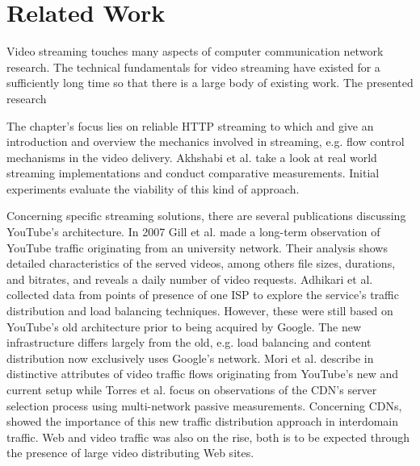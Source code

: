 \section{Related Work}


Video streaming touches many aspects of computer communication network research. The technical fundamentals for video streaming have existed for a sufficiently long time so that there is a large body of existing work. The presented research 

The chapter's focus lies on reliable \gls{HTTP} streaming to which \cite{watching-video1,watching-video2} and \cite{ma2011mobile} give an introduction and overview the mechanics involved in streaming, e.g. flow control mechanisms in the video delivery. Akhshabi et al. \cite{akhshabi2011experimental} take a look at real world streaming implementations and conduct comparative measurements. Initial experiments evaluate the viability of this kind of approach. 

Concerning specific streaming solutions, there are several publications discussing YouTube's architecture. In 2007 Gill et al. \cite{gill2007youtube} made a long-term observation of YouTube traffic originating from an university network. Their analysis shows detailed characteristics of the served videos, among others file sizes, durations, and bitrates, and reveals a daily number of video requests. Adhikari et al. \cite{adhikari2010youtube} collected data from points of presence of one ISP to explore the service's traffic distribution and load balancing techniques. However, these were still based on YouTube's old architecture prior to being acquired by Google. The new infrastructure differs largely from the old, e.g. load balancing and content distribution now exclusively uses Google's network. Mori et al. describe in \cite{mori2010characterizing} distinctive attributes of video traffic flows originating from YouTube's new and current setup while Torres et al. \cite{torres2011dissecting} focus on observations of the \gls{CDN}'s server selection process using multi-network passive measurements. Concerning \glspl{CDN}, \cite{Labovitz:2010:IIT:2043164.1851194} showed the importance of this new traffic distribution approach in interdomain traffic. Web and video traffic was also on the rise, both is to be expected through the presence of large video distributing Web sites.


